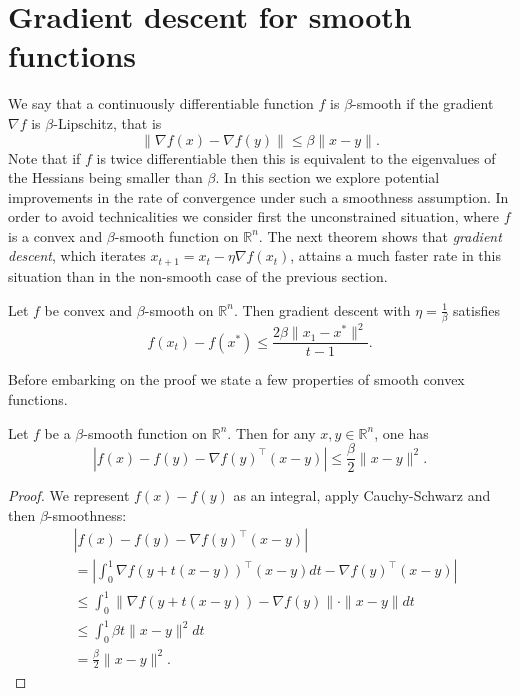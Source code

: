 \documentclass[openany]{now}
\newcommand{\R}{\mathbb{R}}
\begin{document}
\section{Gradient descent for smooth functions} \label{sec:gdsmooth}
We say that a continuously differentiable function $f$ is $\beta$-smooth if the gradient $\nabla f$ is $\beta$-Lipschitz, that is 
$$\|\nabla f(x) - \nabla f(y) \| \leq \beta \|x-y\| .$$
Note that if $f$ is twice differentiable then this is equivalent to the eigenvalues of the Hessians being smaller than $\beta$.
In this section we explore potential improvements in the rate of convergence under such a smoothness assumption.
In order to avoid technicalities we consider first the unconstrained situation, where $f$ is a convex and $\beta$-smooth function on $\R^n$. 
The next theorem shows that {\em gradient descent}, which iterates $x_{t+1} = x_t - \eta \nabla f(x_t)$, attains a much faster rate in this situation than in the non-smooth case of the previous section.

\begin{theorem} \label{th:gdsmooth}
Let $f$ be convex and $\beta$-smooth on $\R^n$. 
Then gradient descent with $\eta = \frac{1}{\beta}$ satisfies
$$f(x_t) - f(x^*) \leq \frac{2 \beta \|x_1 - x^*\|^2}{t-1} .$$
\end{theorem}

Before embarking on the proof we state a few properties of smooth convex functions.
\begin{lemma} \label{lem:sand}
Let $f$ be a $\beta$-smooth function on $\R^n$. Then for any $x, y \in \R^n$, one has
$$|f(x) - f(y) - \nabla f(y)^{\top} (x - y)| \leq \frac{\beta}{2} \|x - y\|^2 .$$
\end{lemma}

\begin{proof}
We represent $f(x) - f(y)$ as an integral, apply Cauchy-Schwarz and then $\beta$-smoothness:
\begin{align*}
& |f(x) - f(y) - \nabla f(y)^{\top} (x - y)| \\
& = \left|\int_0^1 \nabla f(y + t(x-y))^{\top} (x-y) dt -  \nabla f(y)^{\top} (x - y) \right| \\
& \leq \int_0^1 \|\nabla f(y + t(x-y)) -  \nabla f(y)\| \cdot \|x - y\| dt \\
& \leq \int_0^1 \beta t \|x-y\|^2 dt \\
& = \frac{\beta}{2} \|x-y\|^2 .
\end{align*}
\end{proof}
\end{document}
